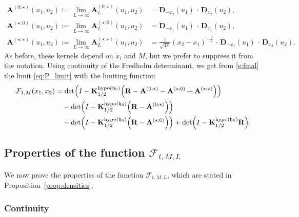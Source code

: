 \documentclass[oneside,final,11pt]{amsart}
\theoremstyle{definition}
\newcommand{\fh}{\mathfrak{h}}
\newcommand{\dens}{\CF}
\newcommand{\1}[1]{\mathbf{1}_{#1}}
\newcommand{\uptext}[1]{\text{\upshape{#1}}}
\DeclareMathOperator{\hypo}{\uptext{hypo}}
\newcommand{\fx}{x}
\newcommand{\fM}{M}
\newcommand{\fD}{\mathbf{D}}
\newcommand{\fA}{\mathbf{A}}
\newcommand{\fK}{\mathbf{K}}
\newcommand{\fR}{\mathbf{R}}
\newcommand{\CF}{\mathcal{F}}
\numberwithin{equation}{section}
\begin{document}
\begin{equation}\label{eq:A-limits}
\begin{aligned}
\fA^{(0; \star)}(u_1, u_2) := \lim_{L \to \infty} \fA_L^{(0; \star)}(u_1, u_2) &= \fD_{-\fx_2}(u_1) \,\cdot\, \fD_{\fx_2}(u_2), \\%
\fA^{(\star; 0)}(u_1, u_2) := \lim_{L \to \infty} \fA_L^{(\star; 0)}(u_1, u_2) &= \fD_{-\fx_1}(u_1) \,\cdot\, \fD_{\fx_1}(u_2), \\%
\fA^{(\star; \star)}(u_1, u_2) := \lim_{L \to \infty} \fA_L^{(\star; \star)}(u_1, u_2) &= \frac{1}{\sqrt{4\pi}} (\fx_2 - \fx_1)^{-\frac{3}{2}} \, \cdot\, \fD_{-\fx_1}(u_1) \,\cdot\, \fD_{\fx_2}(u_2). %
\end{aligned}
\end{equation}
As before, these kernels depend on $x_i$ and $M$, but we prefer to suppress it from the notation. Using continuity of the Fredholm determinant, we get from \eqref{e:final} the limit \eqref{eq:P_limit} with the limiting function
\begin{equation}
\begin{split}
\dens_{1, M}(x_1, x_2) &= \det\Bigl(I- \fK^{\hypo(\fh_0)}_{1/2} \Bigl(\fR - \fA^{(0; \star)} - \fA^{(\star; 0)} + \fA^{(\star; \star)}\Bigr) \Bigr) \\
&\quad - \det\Bigl(I- \fK^{\hypo(\fh_0)}_{1/2} \Bigl(\fR - \fA^{(0; \star)}\Bigr) \Bigr)\\
&\quad - \det \Bigl(I- \fK^{\hypo(\fh_0)}_{1/2} \Bigl(\fR - \fA^{(\star; 0)}\Bigr) \Bigr) + \det \Bigl(I-\fK^{\hypo(\fh_0)}_{1/2}\fR\Bigr).
\end{split}
\label{e:final-infinity}
\end{equation}


\subsection{Properties of the function $\dens_{t, \fM, L}$}
\label{sec:properties_of_P}

We now prove the properties of the function $\dens_{t, \fM, L}$, which are stated in Proposition~\ref{prop:densities}.

\subsubsection{Continuity}
\end{document}
